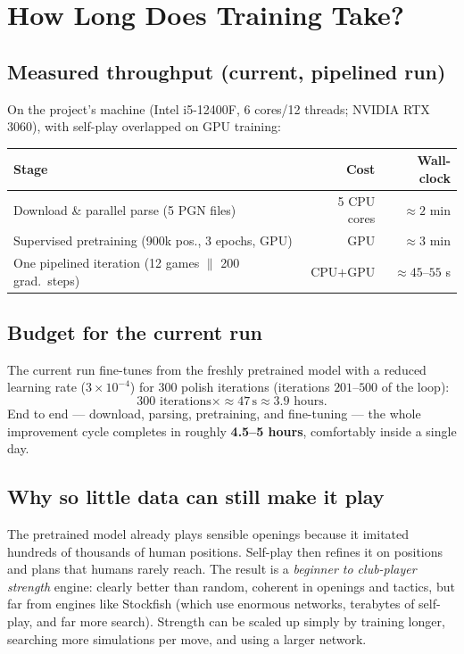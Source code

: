 \documentclass[11pt,a4paper]{article}
\begin{document}
\section{How Long Does Training Take?}

\subsection{Measured throughput (current, pipelined run)}
On the project's machine (Intel i5-12400F, 6 cores/12 threads; NVIDIA RTX 3060),
with self-play overlapped on GPU training:
\begin{center}
\begin{tabular}{lrr}
\toprule
Stage & Cost & Wall-clock \\
\midrule
Download \& parallel parse (5 PGN files) & 5 CPU cores & $\approx 2$ min \\
Supervised pretraining (900k pos., 3 epochs, GPU) & GPU & $\approx 3$ min \\
One pipelined iteration (12 games $\parallel$ 200 grad.\ steps) & CPU$+$GPU & $\approx 45$--$55$ s \\
\bottomrule
\end{tabular}
\end{center}

\subsection{Budget for the current run}
The current run fine-tunes from the freshly pretrained model with a reduced
learning rate ($3\times10^{-4}$) for 300 polish iterations (iterations
$201$--$500$ of the loop):
\[
300 \text{ iterations} \times \approx 47\,\text{s} \approx 3.9 \text{ hours}.
\]
End to end --- download, parsing, pretraining, and fine-tuning ---
the whole improvement cycle completes in roughly \textbf{4.5--5 hours},
comfortably inside a single day.

\subsection{Why so little data can still make it play}
The pretrained model already plays sensible openings because it imitated
hundreds of thousands of human positions. Self-play then refines it on
positions and plans that humans rarely reach. The result is a \emph{beginner
to club-player strength} engine: clearly better than random, coherent in
openings and tactics, but far from engines like Stockfish (which use enormous
networks, terabytes of self-play, and far more search). Strength can be scaled
up simply by training longer, searching more simulations per move, and using a
larger network.
\end{document}
